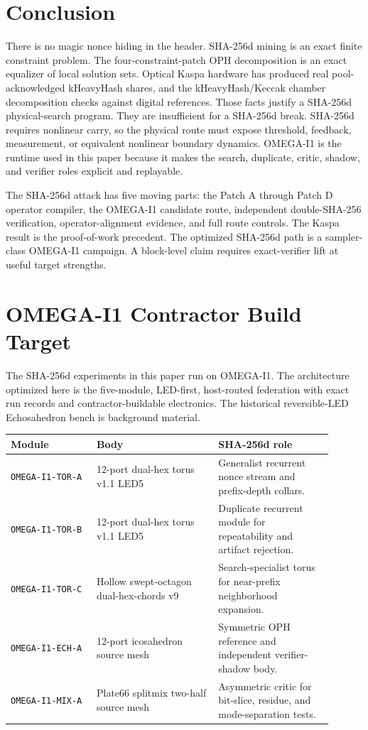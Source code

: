 \documentclass[11pt]{article}
\theoremstyle{definition}
\theoremstyle{remark}
\begin{document}
\section{Conclusion}

There is no magic nonce hiding in the header. SHA-256d mining is an exact
finite constraint problem. The four-constraint-patch OPH decomposition
is an exact equalizer of local solution sets. Optical Kaspa hardware has
produced real pool-acknowledged kHeavyHash shares, and the kHeavyHash/Keccak
chamber decomposition checks against digital references. Those facts justify a
SHA-256d physical-search program. They are insufficient for a SHA-256d break.
SHA-256d requires nonlinear carry, so the physical route must expose threshold,
feedback, measurement, or equivalent nonlinear boundary dynamics. OMEGA-I1 is
the runtime used in this paper because it makes the search, duplicate, critic,
shadow, and verifier roles explicit and replayable.

The SHA-256d attack has five moving parts: the Patch A through Patch D operator
compiler, the OMEGA-I1 candidate route, independent double-SHA-256
verification, operator-alignment evidence, and full route controls. The Kaspa
result is the proof-of-work precedent. The optimized SHA-256d path is a
sampler-class OMEGA-I1 campaign. A block-level claim requires exact-verifier
lift at useful target strengths.

\appendix

\section{OMEGA-I1 Contractor Build Target}
\label{app:omega-i1-build}

The SHA-256d experiments in this paper run on OMEGA-I1. The architecture
optimized here is the five-module, LED-first, host-routed federation with exact
run records and contractor-buildable electronics. The historical
reversible-LED Echosahedron bench is background material.

\begin{center}
\small
\begin{tabular}{L{0.24\linewidth}L{0.34\linewidth}L{0.32\linewidth}}
\toprule
Module & Body & SHA-256d role\\
\midrule
\texttt{OMEGA-I1-TOR-A} & 12-port dual-hex torus v1.1 LED5 &
Generalist recurrent nonce stream and prefix-depth collars.\\
\texttt{OMEGA-I1-TOR-B} & 12-port dual-hex torus v1.1 LED5 &
Duplicate recurrent module for repeatability and artifact rejection.\\
\texttt{OMEGA-I1-TOR-C} & Hollow swept-octagon dual-hex-chords v9 &
Search-specialist torus for near-prefix neighborhood expansion.\\
\texttt{OMEGA-I1-ECH-A} & 12-port icosahedron source mesh &
Symmetric OPH reference and independent verifier-shadow body.\\
\texttt{OMEGA-I1-MIX-A} & Plate66 splitmix two-half source mesh &
Asymmetric critic for bit-slice, residue, and mode-separation tests.\\
\bottomrule
\end{tabular}
\end{center}
\end{document}
